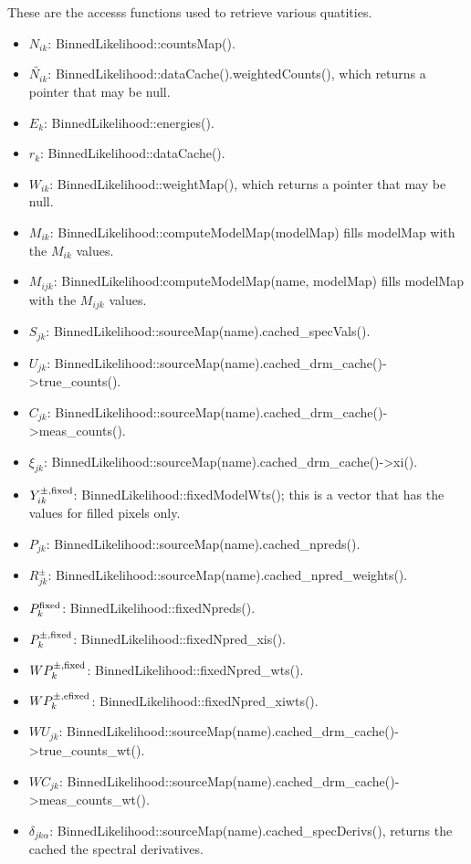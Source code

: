 \documentclass[preprint]{aastex}
\begin{document}
These are the accesss functions used to retrieve various quatities.
\begin{itemize}
\item{ {\bf $N_{ik}$}: BinnedLikelihood::countsMap(). }
\item{ {\bf $\tilde{N_{ik}}$}: BinnedLikelihood::dataCache().weightedCounts(), which returns a pointer that may be null.}
\item{ {\bf $E_k$}: BinnedLikelihood::energies(). }
\item{ {\bf $r_{k}$}: BinnedLikelihood::dataCache(). }
\item{ {\bf $W_{ik}$}: BinnedLikelihood::weightMap(), which returns a pointer that may be null.}
\item{ {\bf $M_{ik}$}: BinnedLikelihood::computeModelMap(modelMap) fills modelMap with the $M_{ik}$ values.}
\item{ {\bf $M_{ijk}$}: BinnedLikelihood:computeModelMap(name, modelMap) fills modelMap with the $M_{ijk}$ values.}
\item{ {\bf $S_{jk}$}: BinnedLikelihood::sourceMap(name).cached\_specVals().}
\item{ {\bf $U_{jk}$}: BinnedLikelihood::sourceMap(name).cached\_drm\_cache()->true\_counts().}
\item{ {\bf $C_{jk}$}: BinnedLikelihood::sourceMap(name).cached\_drm\_cache()->meas\_counts().}
\item{ {\bf $\xi_{jk}$}: BinnedLikelihood::sourceMap(name).cached\_drm\_cache()->xi().}
\item{ {\bf $Y_{ik}^{\pm,\rm fixed}$}: BinnedLikelihood::fixedModelWts(); this is a vector that has the values for filled pixels only.}
\item{ {\bf $P_{jk}$}: BinnedLikelihood::sourceMap(name).cached\_npreds().}
\item{ {\bf $R_{jk}^{\pm}$}: BinnedLikelihood::sourceMap(name).cached\_npred\_weights().}
\item{ {\bf $P_{k}^{\rm fixed}$}: BinnedLikelihood::fixedNpreds().}
\item{ {\bf $P_{k}^{\pm, \rm fixed}$}: BinnedLikelihood::fixedNpred\_xis().}
\item{ {\bf $WP_{k}^{\pm, \rm fixed}$}: BinnedLikelihood::fixedNpred\_wts().}
\item{ {\bf $WP_{k}^{\pm, \rm efixed}$}: BinnedLikelihood::fixedNpred\_xiwts().}
\item{ {\bf $WU_{jk}$}: BinnedLikelihood::sourceMap(name).cached\_drm\_cache()->true\_counts\_wt().}
\item{ {\bf $WC_{jk}$}: BinnedLikelihood::sourceMap(name).cached\_drm\_cache()->meas\_counts\_wt().}
\item{ {\bf $\delta_{jk\alpha}$}: BinnedLikelihood::sourceMap(name).cached\_specDerivs(), returns the cached the spectral derivatives.}
\end{itemize}
\end{document}
